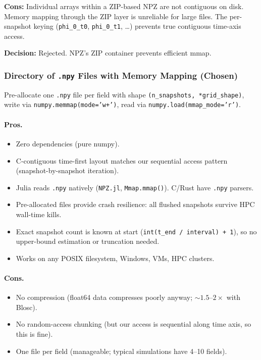 \textbf{Cons:} Individual arrays within a ZIP-based NPZ are not contiguous on disk. Memory mapping through the ZIP layer is unreliable for large files. The per-snapshot keying (\texttt{phi\_0\_t0}, \texttt{phi\_0\_t1}, \ldots) prevents true contiguous time-axis access.

\textbf{Decision:} Rejected. NPZ's ZIP container prevents efficient mmap.

\subsubsection{Directory of \texttt{.npy} Files with Memory Mapping (Chosen)}

Pre-allocate one \texttt{.npy} file per field with shape \texttt{(n\_snapshots, *grid\_shape)}, write via \texttt{numpy.memmap(mode='w+')}, read via \texttt{numpy.load(mmap\_mode='r')}.

\paragraph{Pros.}
\begin{itemize}
  \item Zero dependencies (pure numpy).
  \item C-contiguous time-first layout matches our sequential access pattern (snapshot-by-snapshot iteration).
  \item Julia reads \texttt{.npy} natively (\texttt{NPZ.jl}, \texttt{Mmap.mmap()}). C/Rust have \texttt{.npy} parsers.
  \item Pre-allocated files provide crash resilience: all flushed snapshots survive HPC wall-time kills.
  \item Exact snapshot count is known at start (\texttt{int(t\_end / interval) + 1}), so no upper-bound estimation or truncation needed.
  \item Works on any POSIX filesystem, Windows, VMs, HPC clusters.
\end{itemize}

\paragraph{Cons.}
\begin{itemize}
  \item No compression (float64 data compresses poorly anyway; ${\sim}1.5$--$2\times$ with Blosc).
  \item No random-access chunking (but our access is sequential along time axis, so this is fine).
  \item One file per field (manageable; typical simulations have 4--10 fields).
\end{itemize}

